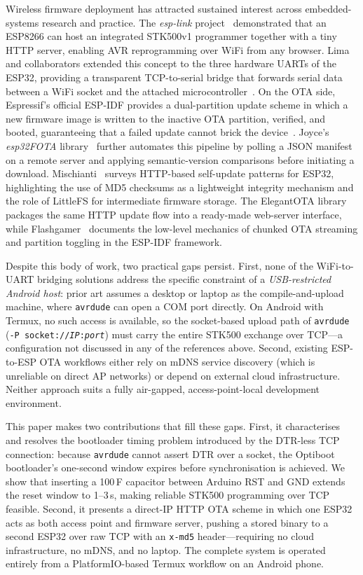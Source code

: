 \documentclass[conference]{IEEEtran}
\begin{document}
Wireless firmware deployment has attracted sustained interest across
embedded-systems research and practice.
The \textit{esp-link} project~\cite{esplink} demonstrated that an ESP8266
can host an integrated STK500v1 programmer together with a tiny HTTP server,
enabling AVR reprogramming over WiFi from any browser.
Lima and collaborators extended this concept to the three hardware UARTs of
the ESP32, providing a transparent TCP-to-serial bridge that forwards serial
data between a WiFi socket and the attached microcontroller~\cite{esp32bridge}.
On the OTA side, Espressif's official ESP-IDF provides a dual-partition update
scheme in which a new firmware image is written to the inactive OTA partition,
verified, and booted, guaranteeing that a failed update cannot brick the
device~\cite{espressifota}.
Joyce's \textit{esp32FOTA} library~\cite{esp32fota} further automates this
pipeline by polling a JSON manifest on a remote server and applying
semantic-version comparisons before initiating a download.
Mischianti~\cite{mischianti} surveys HTTP-based self-update patterns for
ESP32, highlighting the use of MD5 checksums as a lightweight integrity
mechanism and the role of LittleFS for intermediate firmware storage.
The ElegantOTA library~\cite{elegantota} packages the same HTTP update flow
into a ready-made web-server interface, while Flashgamer~\cite{flashgamer}
documents the low-level mechanics of chunked OTA streaming and partition
toggling in the ESP-IDF framework.

Despite this body of work, two practical gaps persist.
First, none of the WiFi-to-UART bridging solutions address the specific
constraint of a \emph{USB-restricted Android host}: prior art assumes a
desktop or laptop as the compile-and-upload machine, where \texttt{avrdude}
can open a COM port directly.
On Android with Termux, no such access is available, so the socket-based
upload path of \texttt{avrdude} (\texttt{-P socket://\textit{IP}:\textit{port}})
must carry the entire STK500 exchange over TCP---a configuration not discussed
in any of the references above.
Second, existing ESP-to-ESP OTA workflows either rely on mDNS service
discovery (which is unreliable on direct AP networks) or depend on external
cloud infrastructure.
Neither approach suits a fully air-gapped, access-point-local development
environment.

This paper makes two contributions that fill these gaps.
First, it characterises and resolves the bootloader timing problem introduced
by the DTR-less TCP connection: because \texttt{avrdude} cannot assert DTR
over a socket, the Optiboot bootloader's one-second window expires before
synchronisation is achieved.
We show that inserting a 100\,\textmu F capacitor between Arduino RST and GND
extends the reset window to 1--3\,s, making reliable STK500 programming over
TCP feasible.
Second, it presents a direct-IP HTTP OTA scheme in which one ESP32 acts as
both access point and firmware server, pushing a stored binary to a second
ESP32 over raw TCP with an \texttt{x-md5} header---requiring no cloud
infrastructure, no mDNS, and no laptop.
The complete system is operated entirely from a PlatformIO-based Termux
workflow on an Android phone.
\end{document}
